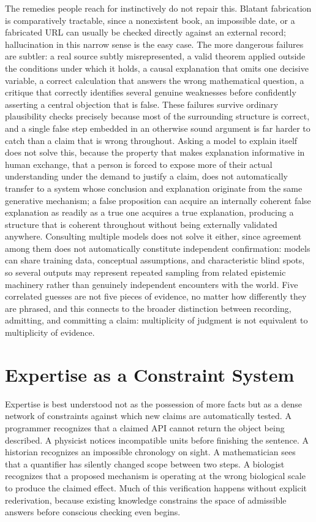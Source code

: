 \documentclass[11pt]{article}
\begin{document}
The remedies people reach for instinctively do not repair this. Blatant fabrication is comparatively tractable, since a nonexistent book, an impossible date, or a fabricated URL can usually be checked directly against an external record; hallucination in this narrow sense is the easy case. The more dangerous failures are subtler: a real source subtly misrepresented, a valid theorem applied outside the conditions under which it holds, a causal explanation that omits one decisive variable, a correct calculation that answers the wrong mathematical question, a critique that correctly identifies several genuine weaknesses before confidently asserting a central objection that is false. These failures survive ordinary plausibility checks precisely because most of the surrounding structure is correct, and a single false step embedded in an otherwise sound argument is far harder to catch than a claim that is wrong throughout. Asking a model to explain itself does not solve this, because the property that makes explanation informative in human exchange, that a person is forced to expose more of their actual understanding under the demand to justify a claim, does not automatically transfer to a system whose conclusion and explanation originate from the same generative mechanism; a false proposition can acquire an internally coherent false explanation as readily as a true one acquires a true explanation, producing a structure that is coherent throughout without being externally validated anywhere. Consulting multiple models does not solve it either, since agreement among them does not automatically constitute independent confirmation: models can share training data, conceptual assumptions, and characteristic blind spots, so several outputs may represent repeated sampling from related epistemic machinery rather than genuinely independent encounters with the world. Five correlated guesses are not five pieces of evidence, no matter how differently they are phrased, and this connects to the broader distinction between recording, admitting, and committing a claim: multiplicity of judgment is not equivalent to multiplicity of evidence.

\section{Expertise as a Constraint System}

Expertise is best understood not as the possession of more facts but as a dense network of constraints against which new claims are automatically tested. A programmer recognizes that a claimed API cannot return the object being described. A physicist notices incompatible units before finishing the sentence. A historian recognizes an impossible chronology on sight. A mathematician sees that a quantifier has silently changed scope between two steps. A biologist recognizes that a proposed mechanism is operating at the wrong biological scale to produce the claimed effect. Much of this verification happens without explicit rederivation, because existing knowledge constrains the space of admissible answers before conscious checking even begins.
\end{document}
